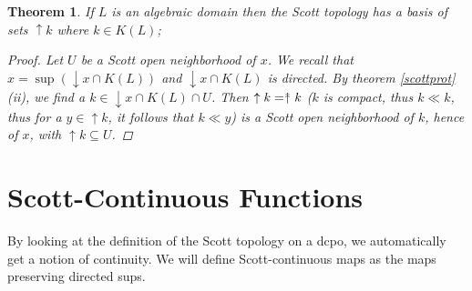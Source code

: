 \documentclass[a4paper,12pt]{article}
\newcommand{\upuparrow}{\mathrel{\reflectbox{\rotatebox[origin=c]{90}{$\twoheadrightarrow$}}}}
\newtheorem{theorem}{Theorem}[section]
\begin{document}
\begin{theorem}\label{toevoeging}
If  $L$ is an algebraic domain then the Scott topology has a basis of sets $\uparrow k$ where $k \in K(L)$;

\begin{proof}
Let $U$ be a Scott open neighborhood of $x$. We recall that $x = \sup(\downarrow x \cap K(L))$ and $\downarrow x \cap K(L)$ is directed. By theorem \ref{scottprot}(ii), we find a $k \in \downarrow x \cap K(L) \cap U$. Then $\uparrow k = \upuparrow k$  ($k$ is compact, thus $k \ll k$, thus for a $y \in \uparrow k$, it follows that $k \ll y$) is a Scott open neighborhood of $k$, hence of $x$, with $\uparrow k \subseteq U$.
\end{proof}
\end{theorem}
\section{Scott-Continuous Functions}
By looking at the definition of the Scott topology on a dcpo, we automatically get a notion of continuity. We will define Scott-continuous maps as the maps preserving directed sups. 
\end{document}

